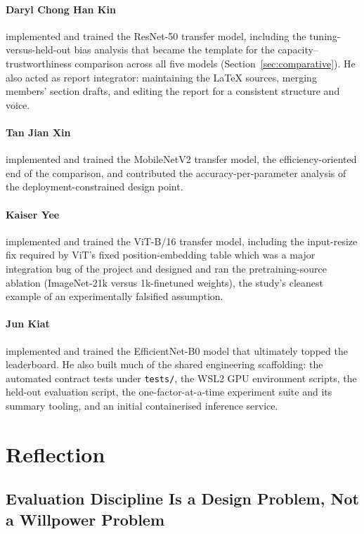 \documentclass[11pt,twoside,a4paper]{article}
\begin{document}
\paragraph{Daryl Chong Han Kin} implemented and trained the ResNet-50
transfer model, including the tuning-versus-held-out bias analysis that
became the template for the capacity--trustworthiness comparison across all
five models (Section~\ref{sec:comparative}). He also acted as report
integrator: maintaining the LaTeX sources, merging members' section drafts,
and editing the report for a consistent structure and voice.

\paragraph{Tan Jian Xin} implemented and trained the MobileNetV2 transfer
model, the efficiency-oriented end of the comparison, and contributed the
accuracy-per-parameter analysis of the deployment-constrained design point.

\paragraph{Kaiser Yee} implemented and trained the ViT-B/16 transfer model,
including the input-resize fix required by ViT's fixed position-embedding
table which was a major integration bug of the project and designed and
ran the pretraining-source ablation (ImageNet-21k versus 1k-finetuned
weights), the study's cleanest example of an experimentally falsified
assumption.

\paragraph{Jun Kiat} implemented and trained the EfficientNet-B0 model that
ultimately topped the leaderboard. He also built much of the shared
engineering scaffolding: the automated contract tests under \texttt{tests/},
the WSL2 GPU environment scripts, the held-out evaluation script, the
one-factor-at-a-time experiment suite and its summary tooling, and an
initial containerised inference service.
\section{Reflection}

\subsection{Evaluation Discipline Is a Design Problem, Not a Willpower Problem}
\end{document}
